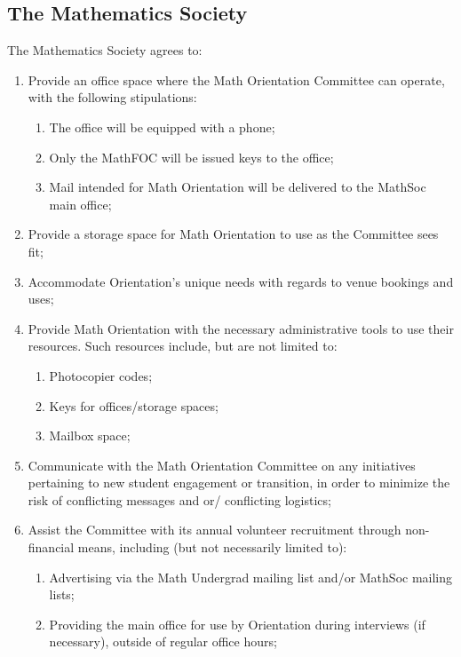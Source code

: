 \documentclass[12pt, letterpaper]{article}
\begin{document}
\subsection{The Mathematics Society}
The Mathematics Society agrees to:
\begin{enumerate}
    \item Provide an office space where the Math Orientation Committee can operate, with the following stipulations:
    \begin{enumerate}
    \item The office will be equipped with a phone;
    \item Only the MathFOC will be issued keys to the office;
    \item Mail intended for Math Orientation will be delivered to the MathSoc main office;
    \end{enumerate}
    \item Provide a storage space for Math Orientation to use as the Committee sees fit;
    \item Accommodate Orientation’s unique needs with regards to venue bookings and uses;
    \item Provide Math Orientation with the necessary administrative tools to use their resources. Such resources include, but are not limited to:
    \begin{enumerate}
    \item Photocopier codes;
    \item Keys for offices/storage spaces;
    \item Mailbox space;
    \end{enumerate}
    \item Communicate with the Math Orientation Committee on any initiatives pertaining to new student engagement or transition, in order to minimize the risk of conflicting messages and or/ conflicting logistics;
    \item Assist the Committee with its annual volunteer recruitment through non-financial means, including (but not necessarily limited to):
    \begin{enumerate}
    \item Advertising via the Math Undergrad mailing list and/or MathSoc mailing lists;
    \item Providing the main office for use by Orientation during interviews (if necessary), outside of regular office hours;
    \end{enumerate}
\end{enumerate}
\end{document}
